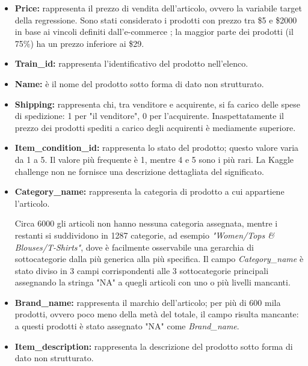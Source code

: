 \begin{itemize}


\item \textbf{Price:} rappresenta il prezzo di vendita dell'articolo, ovvero la
variabile target della regressione. Sono stati considerato i prodotti con prezzo tra \$5 e
\$2000 in base ai vincoli definiti dall'e-commerce
\cite{mercari-how-to-set-a-price}; la maggior parte dei prodotti (il 75\%) ha un
prezzo inferiore ai \$29.

\item \textbf{Train\_id:} rappresenta l'identificativo del prodotto nell'elenco.

\item \textbf{Name:} è il nome del prodotto sotto forma di dato non strutturato.

\item \textbf{Shipping:} rappresenta chi, tra venditore e acquirente, si fa
carico delle spese di spedizione: 1 per "il venditore", 0 per l'acquirente.
Inaspettatamente il prezzo dei prodotti spediti a carico degli
acquirenti è mediamente superiore.

\item \textbf{Item\_condition\_id:} rappresenta lo stato del prodotto; questo valore
varia da 1 a 5. Il valore più frequente è 1, mentre 4 e 5 sono i più rari. La
Kaggle challenge non ne fornisce una descrizione dettagliata del significato.

\item \textbf{Category\_name:} rappresenta la categoria di prodotto a cui appartiene
l'articolo.

Circa 6000 gli articoli non hanno nessuna categoria assegnata, mentre i restanti
si suddividono in 1287 categorie, ad esempio \textit{"Women/Tops \&
Blouses/T-Shirts"}, dove è facilmente osservabile una gerarchia di
sottocategorie dalla più generica alla più specifica. Il campo
\textit{Category\_name} è stato diviso in 3 campi corrispondenti alle 3
sottocategorie principali assegnando la stringa "NA" a quegli articoli con uno o
più livelli mancanti.

\item \textbf{Brand\_name:} rappresenta il marchio dell'articolo; per più di 600
mila prodotti, ovvero poco meno della metà del totale, il campo risulta
mancante: a questi prodotti è stato assegnato "NA" come \textit{Brand\_name}.

\item \textbf{Item\_description:} rappresenta la descrizione del prodotto sotto forma
di dato non strutturato.


\end{itemize}
